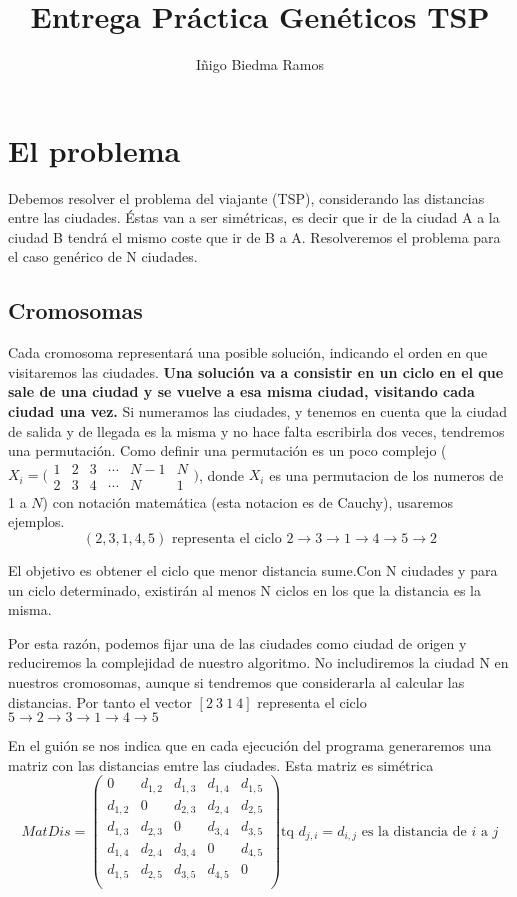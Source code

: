 \documentclass[10pt]{article}
\author{Iñigo Biedma Ramos}
\title{Entrega Práctica Genéticos TSP}
\date{}
\begin{document}
\maketitle
\section{El problema}
Debemos resolver el problema del viajante (TSP), considerando las distancias entre las ciudades. Éstas van a ser simétricas, es decir que ir de la ciudad A a la ciudad B tendrá el mismo coste que ir de B a A. Resolveremos el problema para el caso genérico de N ciudades.
\subsection{Cromosomas}
Cada cromosoma representará una posible solución, indicando el orden en que visitaremos las ciudades. \textbf{Una solución va a consistir en un ciclo en el que sale de una ciudad y se vuelve a esa misma ciudad, visitando cada ciudad una vez.} Si numeramos las ciudades, y tenemos en cuenta que la ciudad de salida y de llegada es la misma y no hace falta escribirla dos veces, tendremos una permutación. Como definir una permutación es un poco complejo ($X_i = \bigl(\begin{smallmatrix}
1 & 2 & 3 & \cdots & N-1 & N \\2 & 3 & 4 & \cdots &  N  & 1\end{smallmatrix}\bigr)$, donde $X_i$ es una permutacion de los numeros de 1 a $N$) con notación matemática (esta notacion es de Cauchy), usaremos ejemplos.
$$(2,3,1,4,5) \text{ representa el ciclo } 2\rightarrow3\rightarrow 1\rightarrow4\rightarrow5\rightarrow2$$
\par
El objetivo es obtener el ciclo que menor distancia sume.Con N ciudades y para un ciclo determinado, existirán al menos N ciclos en los que la distancia es la misma.

Por esta razón, podemos fijar una de las ciudades como ciudad de origen y reduciremos la complejidad de nuestro algoritmo. No includiremos la ciudad N en nuestros cromosomas, aunque si tendremos que considerarla al calcular las distancias. Por tanto el vector $[2\ 3\ 1\ 4]$ representa el ciclo $5\rightarrow2\rightarrow 3\rightarrow1\rightarrow4\rightarrow5$
\par
En el guión se nos indica que en cada ejecución del programa generaremos una matriz con las distancias emtre las ciudades. Esta matriz es simétrica
\[
MatDis=
\begin{pmatrix}
0 & d_{1,2} & d_{1,3} & d_{1,4} & d_{1,5} \\
d_{1,2} & 0 & d_{2,3} & d_{2,4} & d_{2,5} \\
d_{1,3} & d_{2,3} & 0 & d_{3,4} & d_{3,5} \\
d_{1,4} & d_{2,4} & d_{3,4} & 0 & d_{4,5} \\
d_{1,5} & d_{2,5} & d_{3,5} & d_{4,5} & 0 \\
\end{pmatrix}
\text{tq }d_{j,i}=d_{i,j}\text{ es la distancia de }i\text{ a }j
\]
\end{document}
